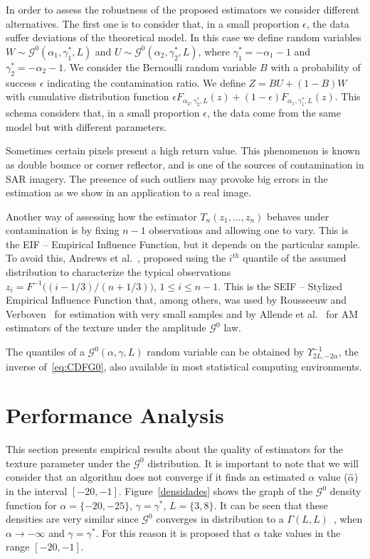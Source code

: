 \documentclass[twocolumn]{svjour3}
\begin{document}
In order to assess the robustness of the proposed estimators we consider different alternatives. The first one is to consider that, in a small proportion $\epsilon$, the data suffer deviations of the theoretical model. In this case we define random variables $W \sim \mathcal{G}^0(\alpha_1,\gamma_1^*,L)$ and $U \sim \mathcal{G}^0(\alpha_2,\gamma_2^*,L)$, where $\gamma_1^*=-\alpha_1-1$ and  $\gamma_2^*=-\alpha_2-1$. 
We consider the Bernoulli random variable $B$ with a probability of success $\epsilon$ indicating the contamination ratio.   
We define $Z=BU+(1-B)W$ with cumulative distribution function   
$
\epsilon {F}_{\alpha_2,\gamma_2^*,L}(z)+(1-\epsilon) {F}_{\alpha_1,\gamma_1^*,L}(z)
$.
This schema considers that, in a small proportion $\epsilon$, the data come from the same model but with different parameters. 

Sometimes certain pixels present a high return value. This phenomenon is known as double bounce or corner reflector, and is one of the sources of contamination in SAR imagery. The presence of such outliers may
provoke big errors in the estimation as we show in an application to a real image. 

Another way of assessing how the estimator $T_n(z_1,\dots,z_n)$ behaves under contamination is by fixing $n-1$ observations and allowing one to vary.
This is the EIF -- Empirical Influence Function, but it depends on the particular sample.
To avoid this, Andrews et al.~\cite{Andrews1972}, proposed using the $i^{th}$ quantile of the assumed distribution to characterize the typical observations $z_i=F^{-1}\big((i-1/3)/(n+1/3) \big)$, $1\leq i\leq n-1$.
This is the SEIF -- Stylized Empirical Influence Function that, among others, was used by Rousseeuw and Verboven~\cite{RousseeuwCSDA} for estimation with very small samples and by Allende et al.~\cite{AllendeFreryetal:JSCS:05} for AM estimators of the texture under the amplitude $\mathcal G^0$ law.

The quantiles of a $\mathcal G^0(\alpha,\gamma,L)$ random variable can be obtained by $\Upsilon^{-1}_{2L,-2\alpha}$, the inverse of~\eqref{eq:CDFG0}, also available in most statistical computing environments.


\section{Performance Analysis}\label{simulation}

This section presents empirical results about the quality of estimators for the texture parameter under the $\mathcal G^0$ distribution. It is important to note that we will consider that an algorithm does not converge if it finds an estimated $\alpha$ value ($\widehat{\alpha}$) in the interval $[-20,-1]$. 	Figure~\ref{densidades} shows the graph of the $\mathcal{G}^0$ density function for  $\alpha=\{-20,-25\}$, $\gamma=\gamma^*$, $L=\{3,8\}$. It can be seen that these densities are very similar since $\mathcal{G}^0$ converges in distribution to a $\Gamma(L,L)$~\cite{Frery99}, when  $\alpha \longrightarrow -\infty$ and $\gamma=\gamma^*$. For this reason it is proposed that $\alpha$ take values in the range $[-20,-1]$. 
\end{document}

